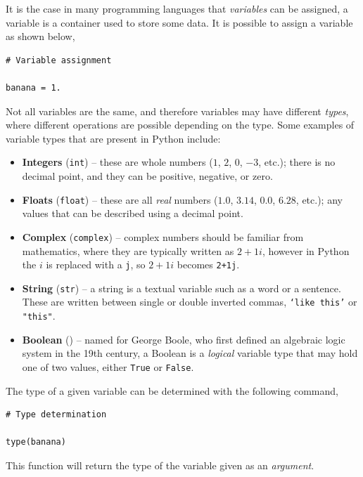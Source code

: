 \documentclass[a4paper]{article}
\begin{document}
It is the case in many programming languages that \emph{variables} can be assigned, a variable is a container used to store some data.
It is possible to assign a variable as shown below,
\begin{lstlisting}
# Variable assignment

banana = 1.
\end{lstlisting}
Not all variables are the same, and therefore variables may have different \emph{types}, where different operations are possible depending on the type.
Some examples of variable types that are present in Python include:
\begin{itemize}
	\item{\textbf{Integers} (\texttt{int}) -- these are whole numbers ($1$, $2$, $0$, $-3$, etc.); there is no decimal point, and they can be positive, negative, or zero.}
	\item{\textbf{Floats} (\texttt{float}) -- these are all \emph{real} numbers ($1.0$, $3.14$, $0.0$, $6.28$, etc.); any values that can be described using a decimal point.}
	\item{\textbf{Complex} (\texttt{complex}) -- complex numbers should be familiar from mathematics, where they are typically written as $2+1i$, however in Python the $i$ is replaced with a \texttt{j}, so $2+1i$ becomes \texttt{2+1j}.}
	\item{\textbf{String} (\texttt{str}) -- a string is a textual variable such as a word or a sentence. These are written between single or double inverted commas, \texttt{`like this'} or \texttt{"this"}.}
	\item{\textbf{Boolean} () -- named for George Boole, who first defined an algebraic logic system in the 19th century, a Boolean is a \emph{logical} variable type that may hold one of two values, either \texttt{True} or \texttt{False}.}
\end{itemize}
The type of a given variable can be determined with the following command,
\begin{lstlisting}
# Type determination

type(banana)
\end{lstlisting}
This function will return the type of the variable given as an \emph{argument}.
\end{document}
